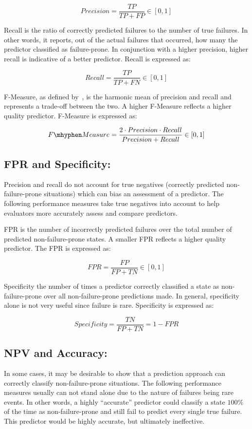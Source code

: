 \[ Precision 
	= \dfrac{TP}{TP + FP} \in [0,1]
\]

Recall is the ratio of correctly predicted failures to the number of true
failures.  In other words, it reports, out of the actual failures that
occurred, how many the predictor classified as failure-prone.  In conjunction
with a higher precision, higher recall is indicative of a better predictor.
Recall is expressed as:

\[ Recall 
	= \dfrac{TP}{TP + FN} \in [0,1]
\]

F-Measure, as defined by~\cite{rijsbergen1979v}, is the harmonic mean of
precision and recall and represents a trade-off between the two.  A higher
F-Measure reflects a higher quality predictor.  F-Measure is expressed as:

\[ F\mhyphen Measure 
	= \dfrac{2 \cdot Precision \cdot Recall}{Precision + Recall} \in [0,1]
\]

\subsection{\ac{FPR} and Specificity:}
Precision and recall do not account for true negatives (correctly predicted
non-failure-prone situations) which can bias an assessment of a predictor.  The
following performance measures take true negatives into account to help
evaluators more accurately assess and compare predictors.

\ac{FPR} is the number of incorrectly predicted failures over the total number
of predicted non-failure-prone states.  A smaller \ac{FPR} reflects a higher
quality predictor.  The \ac{FPR} is expressed as:

\[ \mathit{FPR}
	= \dfrac{FP}{FP + TN} \in [0,1]
\]

Specificity the number of times a predictor correctly classified a state as
non-failure-prone over all non-failure-prone predictions made.  In general,
specificity alone is not very useful since failure is rare.  Specificity is
expressed as:

\[ Specificity 
	= \dfrac{TN}{FP + TN} = 1 - FPR
\]

\subsection{\ac{NPV} and Accuracy:}
In some cases, it may be desirable to show that a prediction approach can
correctly classify non-failure-prone situations.  The following performance
measures usually can not stand alone due to the nature of failures being rare
events.  In other words, a highly ``accurate'' predictor could classify a state
$100\%$ of the time as non-failure-prone and still fail to predict every single
true failure.  This predictor would be highly accurate, but ultimately
ineffective.


